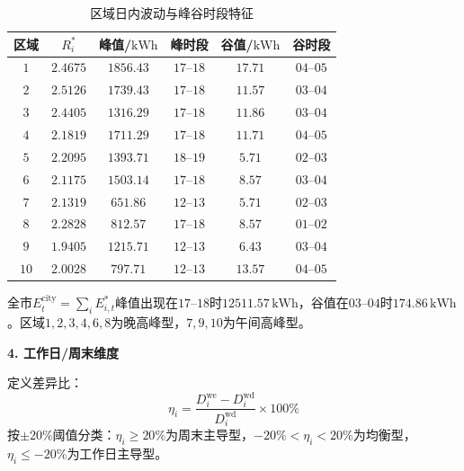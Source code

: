 \documentclass[a4paper,12pt]{ctexart}
\begin{document}
\begin{table}[H]
\centering
\caption{区域日内波动与峰谷时段特征}
\begin{tabular}{cccccc}
\toprule
区域 & $R_{i}^{*}$ & 峰值/$\mathrm{kWh}$ & 峰时段 & 谷值/$\mathrm{kWh}$ & 谷时段 \\
\midrule
$1$ & $2.4675$ & $1856.43$ & $17\text{--}18$ & $17.71$ & $04\text{--}05$ \\
$2$ & $2.5126$ & $1739.43$ & $17\text{--}18$ & $11.57$ & $03\text{--}04$ \\
$3$ & $2.4405$ & $1316.29$ & $17\text{--}18$ & $11.86$ & $03\text{--}04$ \\
$4$ & $2.1819$ & $1711.29$ & $17\text{--}18$ & $11.71$ & $04\text{--}05$ \\
$5$ & $2.2095$ & $1393.71$ & $18\text{--}19$ & $5.71$ & $02\text{--}03$ \\
$6$ & $2.1175$ & $1503.14$ & $17\text{--}18$ & $8.57$ & $03\text{--}04$ \\
$7$ & $2.1319$ & $651.86$ & $12\text{--}13$ & $5.71$ & $02\text{--}03$ \\
$8$ & $2.2828$ & $812.57$ & $17\text{--}18$ & $8.57$ & $01\text{--}02$ \\
$9$ & $1.9405$ & $1215.71$ & $12\text{--}13$ & $6.43$ & $03\text{--}04$ \\
$10$ & $2.0028$ & $797.71$ & $12\text{--}13$ & $13.57$ & $04\text{--}05$ \\
\bottomrule
\end{tabular}
\end{table}

全市$E_{t}^{\mathrm{city}}=\sum_{i}E_{i,t}^{*}$峰值出现在$17\text{--}18$时$12511.57\,\mathrm{kWh}$，谷值在$03\text{--}04$时$174.86\,\mathrm{kWh}$。区域$1,2,3,4,6,8$为晚高峰型，$7,9,10$为午间高峰型。


\textbf{4. 工作日/周末维度}

定义差异比：
\begin{equation}
\eta_{i}=\frac{D_{i}^{\mathrm{we}}-D_{i}^{\mathrm{wd}}}{D_{i}^{\mathrm{wd}}}\times100\%\tag{1-4}
\end{equation}
按$\pm20\%$阈值分类：$\eta_{i}\ge20\%$为周末主导型，$-20\%<\eta_{i}<20\%$为均衡型，$\eta_{i}\le-20\%$为工作日主导型。
\end{document}

